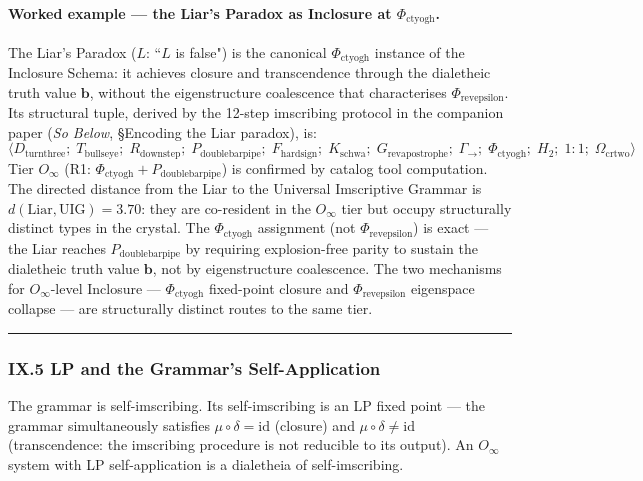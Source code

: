 \documentclass[12pt,a4paper]{article}
\newcommand{\UIG}{Universal Imscriptive Grammar}
\begin{document}
\paragraph{Worked example --- the Liar's Paradox as Inclosure at $\Phi_{\text{ctyogh}}$.}
The Liar's Paradox ($L$: ``$L$ is false") is the canonical $\Phi_{\text{ctyogh}}$ instance of the Inclosure Schema: it achieves closure and transcendence through the dialetheic truth value $\mathbf{b}$, without the eigenstructure coalescence that characterises $\Phi_{\text{revepsilon}}$. Its structural tuple, derived by the 12-step imscribing protocol in the companion paper (\emph{So Below}, \S{}Encoding the Liar paradox), is:
\begin{equation}
\langle D_{\text{turnthree}};\; T_{\text{bullseye}};\; R_{\text{downstep}};\; P_{\text{doublebarpipe}};\; F_{\text{hardsign}};\; K_{\text{schwa}};\; G_{\text{revapostrophe}};\; \Gamma_{\to};\; \Phi_{\text{ctyogh}};\; H_2;\; 1{:}1;\; \Omega_{\text{crtwo}} \rangle
\label{eq:liar_as_above}
\end{equation}
Tier $O_\infty$ (R1: $\Phi_{\text{ctyogh}} + P_{\text{doublebarpipe}}$) is confirmed by catalog tool computation. The directed distance from the Liar to the \UIG{} is $d(\text{Liar}, \text{UIG}) = 3.70$: they are co-resident in the $O_\infty$ tier but occupy structurally distinct types in the crystal. The $\Phi_{\text{ctyogh}}$ assignment (not $\Phi_{\text{revepsilon}}$) is exact --- the Liar reaches $P_{\text{doublebarpipe}}$ by requiring explosion-free parity to sustain the dialetheic truth value $\mathbf{b}$, not by eigenstructure coalescence. The two mechanisms for $O_\infty$-level Inclosure --- $\Phi_{\text{ctyogh}}$ fixed-point closure and $\Phi_{\text{revepsilon}}$ eigenspace collapse --- are structurally distinct routes to the same tier.

\begin{center}
\rule{0.5\textwidth}{0.4pt}
\end{center}

\subsubsection{IX.5 LP and the Grammar's Self-Application}
The grammar is self-imscribing. Its self-imscribing is an LP fixed point --- the grammar simultaneously satisfies $\mu \circ \delta = \text{id}$ (closure) and $\mu \circ \delta \neq \text{id}$ (transcendence: the imscribing procedure is not reducible to its output). An $O_{\infty}$ system with LP self-application is a dialetheia of self-imscribing.
\end{document}
